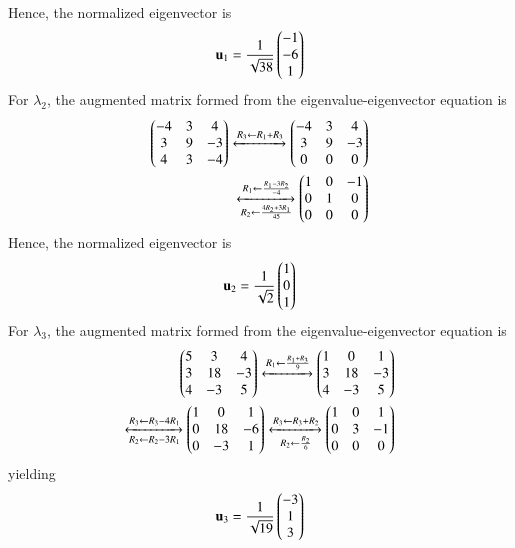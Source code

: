 \begin{enumerate}
\begin{align*}
        \end{align*}
        Hence, the normalized eigenvector is
        \begin{align}
		\mathbf{u}_1 = \frac{1}{\sqrt{38}}\begin{pmatrix}-1\\-6\\1\end{pmatrix}
        \end{align}
        For $\lambda_2$, the augmented matrix formed from the 
        eigenvalue-eigenvector equation is
        \begin{align*}
            \begin{pmatrix}-4&3&4\\3&9&-3\\4&3&-4\end{pmatrix} 
            \xleftrightarrow[]{R_3 \leftarrow R_1+R_3} \begin{pmatrix}-4&3&4\\3&9&-3\\0&0&0\end{pmatrix} \\
            \xleftrightarrow[R_2 \leftarrow \frac{4R_2+3R_1}{45}]{R_1 \leftarrow \frac{R_1-3R_2}{-4}} \begin{pmatrix}1&0&-1\\0&1&0\\0&0&0\end{pmatrix}
        \end{align*}
        Hence, the normalized eigenvector is
        \begin{align}
		\mathbf{u}_2 = \frac{1}{\sqrt{2}}\begin{pmatrix}1\\0\\1\end{pmatrix}
        \end{align}
        For $\lambda_3$, the augmented matrix formed from the 
        eigenvalue-eigenvector equation is
        \begin{align*}
            \begin{pmatrix}5&3&4\\3&18&-3\\4&-3&5\end{pmatrix} 
            \xleftrightarrow[]{R_1 \leftarrow \frac{R_1+R_3}{9}} \begin{pmatrix}1&0&1\\3&18&-3\\4&-3&5\end{pmatrix} \\
            \xleftrightarrow[R_2 \leftarrow R_2-3R_1]{R_3 \leftarrow R_3-4R_1} \begin{pmatrix}1&0&1\\0&18&-6\\0&-3&1\end{pmatrix} 
            \xleftrightarrow[R_2 \leftarrow \frac{R_2}{6}]{R_3 \leftarrow R_3+R_2} \begin{pmatrix}1&0&1\\0&3&-1\\0&0&0\end{pmatrix}
        \end{align*}
	yielding
        \begin{align}
		\mathbf{u}_3 = \frac{1}{\sqrt{19}}\begin{pmatrix}-3\\1\\3\end{pmatrix}
        \end{align}

\end{enumerate}
